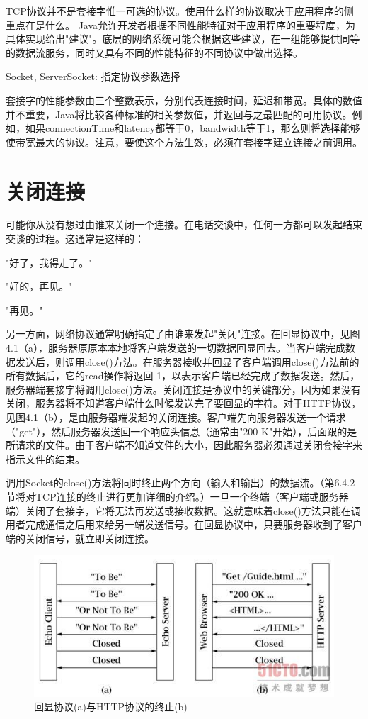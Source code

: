 		TCP协议并不是套接字惟一可选的协议。使用什么样的协议取决于应用程序的侧重点在是什么。 Java允许开发者根据不同性能特征对于应用程序的重要程度，为具体实现给出"建议"。底层的网络系统可能会根据这些建议，在一组能够提供同等的数据流服务，同时又具有不同的性能特征的不同协议中做出选择。 

		Socket, ServerSocket: 指定协议参数选择 

		

		套接字的性能参数由三个整数表示，分别代表连接时间，延迟和带宽。具体的数值并不重要，Java将比较各种标准的相关参数值，并返回与之最匹配的可用协议。例如，如果connectionTime和latency都等于0，bandwidth等于1，那么则将选择能够使带宽最大的协议。注意，要使这个方法生效，必须在套接字建立连接之前调用。 

\section{关闭连接} 

	可能你从没有想过由谁来关闭一个连接。在电话交谈中，任何一方都可以发起结束交谈的过程。这通常是这样的： 

	"好了，我得走了。" 

	"好的，再见。" 

	"再见。" 

	另一方面，网络协议通常明确指定了由谁来发起"关闭"连接。在回显协议中，见图4.1（a），服务器原原本本地将客户端发送的一切数据回显回去。当客户端完成数据发送后，则调用close()方法。在服务器接收并回显了客户端调用close()方法前的所有数据后，它的read操作将返回-1，以表示客户端已经完成了数据发送。然后，服务器端套接字将调用close()方法。关闭连接是协议中的关键部分，因为如果没有关闭，服务器将不知道客户端什么时候发送完了要回显的字符。对于HTTP协议，见图4.1（b），是由服务器端发起的关闭连接。客户端先向服务器发送一个请求（"get"），然后服务器发送回一个响应头信息（通常由"200 K"开始），后面跟的是所请求的文件。由于客户端不知道文件的大小，因此服务器必须通过关闭套接字来指示文件的结束。 

	调用Socket的close()方法将同时终止两个方向（输入和输出）的数据流。（第6.4.2节将对TCP连接的终止进行更加详细的介绍。）一旦一个终端（客户端或服务器端）关闭了套接字，它将无法再发送或接收数据。这就意味着close()方法只能在调用者完成通信之后用来给另一端发送信号。在回显协议中，只要服务器收到了客户端的关闭信号，就立即关闭连接。 

	\begin{figure}[htbp]%
		\centering
		\includegraphics[scale=.8]{img/04.01.jpg}
		\caption{回显协议(a)与HTTP协议的终止(b)}
		\label{fig:echo.pt.and.http.end}
	\end{figure}

